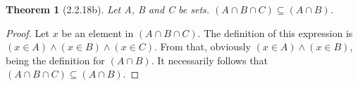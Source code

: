 \documentclass[a4paper, 12pt]{article}
\theoremstyle{plain}
\newtheorem*{theorem*}{Theorem}
\begin{document}
	
	\begin{theorem*}[2.2.18b]
		Let A, B and C be sets. $(A \cap B \cap C) \subseteq (A \cap B)$.
	\end{theorem*}
	
	\begin{proof}
		Let $x$ be an element in $(A \cap B \cap C)$. The definition of this expression is $(x \in A) \land (x \in B) \land (x \in C)$. From that, obviously $(x \in A) \land (x \in B)$, being the definition for $(A \cap B)$. It necessarily follows that $(A \cap B \cap C) \subseteq (A \cap B)$.
	\end{proof}
\end{document}
